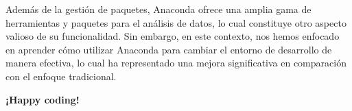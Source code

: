 \documentclass[
  letterpaper,
  DIV=11,
  numbers=noendperiod]{scrartcl}
\begin{document}
Además de la gestión de paquetes, Anaconda ofrece una amplia gama de
herramientas y paquetes para el análisis de datos, lo cual constituye
otro aspecto valioso de su funcionalidad. Sin embargo, en este contexto,
nos hemos enfocado en aprender cómo utilizar Anaconda para cambiar el
entorno de desarrollo de manera efectiva, lo cual ha representado una
mejora significativa en comparación con el enfoque tradicional.

\textbf{¡Happy coding!}


\printbibliography
\end{document}
